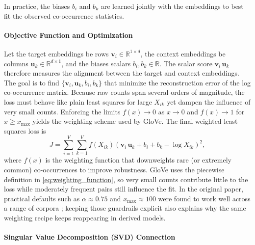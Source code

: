 In practice, the biases \( b_i \) and \( b_k \) are learned jointly with the embeddings to best fit the observed co-occurrence statistics.

\paragraph{Objective Function and Optimization}

Let the target embeddings be rows \( \mathbf{v}_i \in \mathbb{R}^{1\times d} \), the context embeddings be columns \( \mathbf{u}_k \in \mathbb{R}^{d\times 1} \), and the biases scalars \( b_i, b_k \in \mathbb{R} \). The scalar score \( \mathbf{v}_i\,\mathbf{u}_k \) therefore measures the alignment between the target and context embeddings. The goal is to find \( \{\mathbf{v}_i, \mathbf{u}_k, b_i, b_k\} \) that minimize the reconstruction error of the log co-occurrence matrix. Because raw counts span several orders of magnitude, the loss must behave like plain least squares for large \(X_{ik}\) yet dampen the influence of very small counts. Enforcing the limits \(f(x) \to 0\) as \(x \to 0\) and \(f(x) \to 1\) for \(x \ge x_{\max}\) yields the weighting scheme used by GloVe. The final weighted least-squares loss is
\begin{equation}
    J = \sum_{i=1}^{V}\sum_{k=1}^{V} f(X_{ik}) \left( \mathbf{v}_i\,\mathbf{u}_k + b_i + b_k - \log X_{ik} \right)^2,
    \label{eq:objective}
\end{equation}
where \( f(x) \) is the weighting function that downweights rare (or extremely common) co-occurrences to improve robustness. GloVe uses the piecewise definition in \eqref{eq:weighting_function}, so very small counts contribute little to the loss while moderately frequent pairs still influence the fit. In the original paper, practical defaults such as \(\alpha \approx 0.75\) and \(x_{\max}\approx 100\) were found to work well across a range of corpora \citep{Pennington2014}; keeping those guardrails explicit also explains why the same weighting recipe keeps reappearing in derived models.

\paragraph{Singular Value Decomposition (SVD) Connection}

